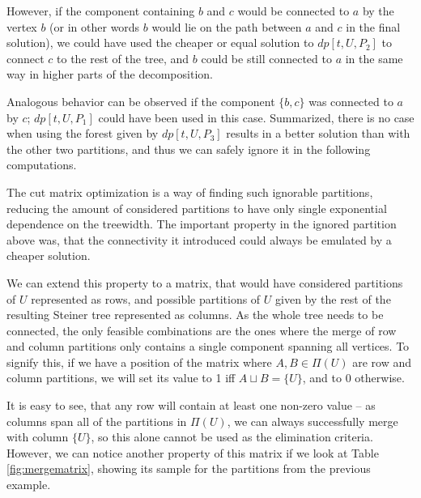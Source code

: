 \documentclass[thesis=M,english,hidelinks]{FITthesis}[2012/10/20]
\theoremstyle{definition}
\begin{document}
However, if the component containing $b$ and $c$ would be connected to $a$ by the vertex $b$ (or in other words $b$
would lie on the path between $a$ and $c$ in the final solution), we could have used the cheaper or equal solution to
$dp[t, U, P_2]$ to connect $c$ to the rest of the tree, and $b$ could be still connected to $a$ in the same way in
higher parts of the decomposition.

Analogous behavior can be observed if the component $\{b, c\}$ was connected to $a$ by $c$; $dp[t, U, P_1]$ could have
been used in this case. Summarized, there is no case when using the forest given by $dp[t, U, P_3]$ results in a better
solution than with the other two partitions, and thus we can safely ignore it in the following computations.

The cut matrix optimization is a way of finding such ignorable partitions, reducing the amount of considered partitions
to have only single exponential dependence on the treewidth. The important property in the ignored partition above was,
that the connectivity it introduced could always be emulated by a cheaper solution.

We can extend this property to a matrix, that would have considered partitions of $U$ represented as rows, and possible
partitions of $U$ given by the rest of the resulting Steiner tree represented as columns. As the whole tree needs to
be connected, the only feasible combinations are the ones where the merge of row and column partitions only contains a
single component spanning all vertices. To signify this, if we have a position of the matrix where $A, B \in \Pi(U)$ are
row and column partitions, we will set its value to 1 iff $A \sqcup B = \{U\}$, and to 0 otherwise.

It is easy to see, that any row will contain at least one non-zero value -- as columns span all of the partitions in
$\Pi(U)$, we can always successfully merge with column $\{U\}$, so this alone cannot be used as the elimination
criteria. However, we can notice another property of this matrix if we look at Table \ref{fig:mergematrix}, showing its
sample for the partitions from the previous example.
\end{document}
